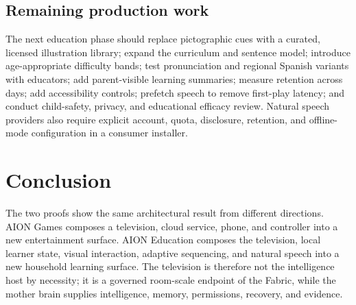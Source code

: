 \documentclass[11pt,a4paper]{article}
\begin{document}
\subsection{Remaining production work}

The next education phase should replace pictographic cues with a curated,
licensed illustration library; expand the curriculum and sentence model;
introduce age-appropriate difficulty bands; test pronunciation and regional
Spanish variants with educators; add parent-visible learning summaries;
measure retention across days; add accessibility controls; prefetch speech to
remove first-play latency; and conduct child-safety, privacy, and educational
efficacy review.  Natural speech providers also require explicit account,
quota, disclosure, retention, and offline-mode configuration in a consumer
installer.

\section{Conclusion}

The two proofs show the same architectural result from different directions.
AION Games composes a television, cloud service, phone, and controller into a
new entertainment surface.  AION Education composes the television, local
learner state, visual interaction, adaptive sequencing, and natural speech
into a new household learning surface.  The television is therefore not the
intelligence host by necessity; it is a governed room-scale endpoint of the
Fabric, while the mother brain supplies intelligence, memory, permissions,
recovery, and evidence.
\end{document}
